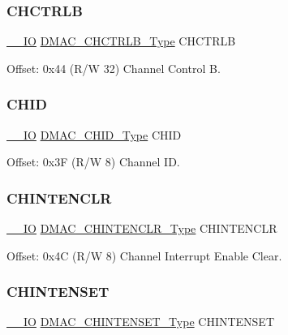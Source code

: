 \subsubsection{\texorpdfstring{CHCTRLB}{CHCTRLB}}
{\footnotesize\ttfamily \mbox{\hyperlink{core__cm0plus_8h_aec43007d9998a0a0e01faede4133d6be}{\+\_\+\+\_\+\+IO}} \mbox{\hyperlink{union_d_m_a_c___c_h_c_t_r_l_b___type}{D\+M\+A\+C\+\_\+\+C\+H\+C\+T\+R\+L\+B\+\_\+\+Type}} C\+H\+C\+T\+R\+LB}



Offset\+: 0x44 (R/W 32) Channel Control B. 

\mbox{\label{struct_dmac_a8ca3ffa77dadd1671aea1c0dae79203e}} 
\subsubsection{\texorpdfstring{CHID}{CHID}}
{\footnotesize\ttfamily \mbox{\hyperlink{core__cm0plus_8h_aec43007d9998a0a0e01faede4133d6be}{\+\_\+\+\_\+\+IO}} \mbox{\hyperlink{union_d_m_a_c___c_h_i_d___type}{D\+M\+A\+C\+\_\+\+C\+H\+I\+D\+\_\+\+Type}} C\+H\+ID}



Offset\+: 0x3F (R/W 8) Channel ID. 

\mbox{\label{struct_dmac_a162ee7b98e87fe47dbb2dbcf5312b08b}} 
\subsubsection{\texorpdfstring{CHINTENCLR}{CHINTENCLR}}
{\footnotesize\ttfamily \mbox{\hyperlink{core__cm0plus_8h_aec43007d9998a0a0e01faede4133d6be}{\+\_\+\+\_\+\+IO}} \mbox{\hyperlink{union_d_m_a_c___c_h_i_n_t_e_n_c_l_r___type}{D\+M\+A\+C\+\_\+\+C\+H\+I\+N\+T\+E\+N\+C\+L\+R\+\_\+\+Type}} C\+H\+I\+N\+T\+E\+N\+C\+LR}



Offset\+: 0x4C (R/W 8) Channel Interrupt Enable Clear. 

\mbox{\label{struct_dmac_a47abea7e3b538e7a0598831c2bbcb399}} 
\subsubsection{\texorpdfstring{CHINTENSET}{CHINTENSET}}
{\footnotesize\ttfamily \mbox{\hyperlink{core__cm0plus_8h_aec43007d9998a0a0e01faede4133d6be}{\+\_\+\+\_\+\+IO}} \mbox{\hyperlink{union_d_m_a_c___c_h_i_n_t_e_n_s_e_t___type}{D\+M\+A\+C\+\_\+\+C\+H\+I\+N\+T\+E\+N\+S\+E\+T\+\_\+\+Type}} C\+H\+I\+N\+T\+E\+N\+S\+ET}



